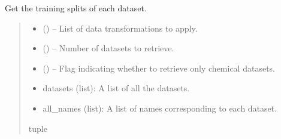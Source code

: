 \documentclass[letterpaper,10pt,english]{sphinxhowto}
\begin{document}

\begin{fulllineitems}
\label{\detokenize{datasets:datasets.get_train_datasets}}
\pysigstartsignatures
{}
\pysigstopsignatures
\sphinxAtStartPar
Get the training splits of each dataset.
\begin{quote}\begin{description}
\begin{itemize}
\item {} 
\sphinxAtStartPar
{} () – List of data transformations to apply.

\item {} 
\sphinxAtStartPar
{} () – Number of datasets to retrieve.

\item {} 
\sphinxAtStartPar
{} () – Flag indicating whether to retrieve only chemical datasets.

\end{itemize}

\sphinxAtStartPar
\begin{description}
\begin{itemize}
\item {} 
\sphinxAtStartPar
datasets (list): A list of all the datasets.

\item {} 
\sphinxAtStartPar
all\_names (list): A list of names corresponding to each dataset.

\end{itemize}

\end{description}


\sphinxAtStartPar
tuple

\end{description}\end{quote}

\end{fulllineitems}
\end{document}
